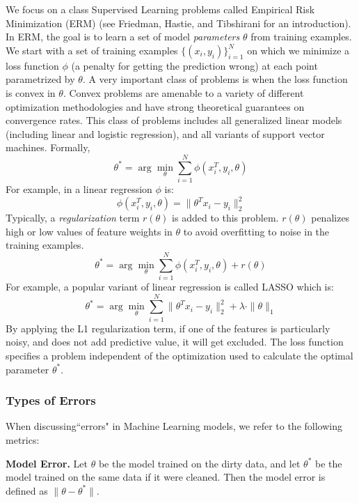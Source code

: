 We focus on a class Supervised Learning problems called Empirical Risk Minimization (ERM) (see Friedman, Hastie, and Tibshirani \cite{friedman2001elements} for an introduction).
In ERM, the goal is to learn a set of model \emph{parameters} $\theta$ from training examples.
We start with a set of training examples $\{(x_{i},y_{i})\}_{i=1}^{N}$
on which we minimize a loss function $\phi$ (a penalty for getting the prediction wrong) at each point parametrized by $\theta$.
A very important class of problems is when the loss function is convex in $\theta$.
Convex problems are amenable to a variety of different optimization methodologies
and have strong theoretical guarantees on convergence rates.
This class of problems includes all generalized linear models (including linear and logistic regression), and all variants of support vector machines.
Formally,
\[
 \theta^{*}=\arg\min_{\theta}\sum_{i=1}^{N}\phi(x_{i}^T,y_{i},\theta)
\]
For example, in a linear regression $\phi$ is:
\[
\phi(x_{i}^T,y_{i},\theta) = \|\theta^Tx_{i} - y_i \|_2^2
\]
Typically, a \emph{regularization} term $r(\theta)$ is added to this problem.
$r(\theta)$ penalizes high or low values of feature weights in $\theta$ to avoid overfitting to noise in the training examples.
\[
 \theta^{*}=\arg\min_{\theta}\sum_{i=1}^{N}\phi(x_{i}^T,y_{i},\theta) + r(\theta)
\]
For example, a popular variant of linear regression is called LASSO which is:
\[
 \theta^{*}=\arg\min_{\theta}\sum_{i=1}^{N}\|\theta^Tx_{i} - y_i \|_2^2 + \lambda \cdot \|\theta\|_1
\]
By applying the L1 regularization term, if one of the features is particularly noisy, and does not add predictive value, it will get excluded.
The loss function specifies a problem independent of the optimization used to calculate the optimal parameter $\theta^{*}$.

\subsubsection{Types of Errors}
When discussing``errors" in Machine Learning models, we refer to the following metrics:

\vspace{0.5em}

\noindent\textbf{Model Error. } Let $\theta$ be the model trained on the dirty data, and let $\theta^*$ be the model trained on the same data if it were cleaned. Then the model error is defined as $\|\theta - \theta^*\|$.

\vspace{0.5em}

